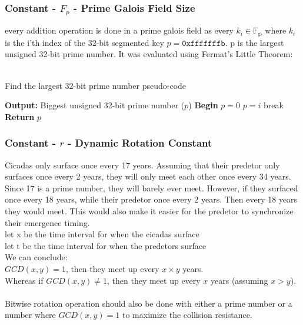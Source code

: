 \documentclass[fleqn, a4paper,12pt]{article}
\begin{document}
\subsubsection{Constant - $F_p$ - Prime Galois Field Size}

every addition operation is done in a prime galois field as every $k_i \in \mathbb{F_p}$ where $k_i$ is the i'th index of the 32-bit segmented key $p = \texttt{0xfffffffb}$. p is the largest unsigned 32-bit prime number. It was evaluated using Fermat's Little Theorem:\\
\\
\begin{algorithm}[H] %
\caption{Find the largest 32-bit prime number pseudo-code}
\begin{algorithmic}[1]  %
\State \textbf{Output:} Biggest unsigned 32-bit prime number ($p$)
\State \textbf{Begin}
\State $p = 0$
		\State $p = i$
		\State break
	\EndIf
\EndFor
\State \textbf{Return} $p$
\end{algorithmic}
\end{algorithm}

\subsubsection{Constant - $r$ - Dynamic Rotation Constant} \label{rotation_constant}

Cicadas only surface once every 17 years. Assuming that their predetor only surfaces once every 2 years, they will only meet each other once every 34 years. Since 17 is a prime number, they will barely ever meet. However, if they surfaced once every 18 years, while their predetor once every 2 years. Then every 18 years they would meet. This would also make it easier for the predetor to synchronize their emergence timing.\\
let x be the time interval for when the cicadas surface \\
let t be the time interval for when the predetors surface \\
We can conclude:\\
$GCD(x,y) = 1$, then they meet up every $x \times y$ years. \\
Whereas if $GCD(x,y) \neq 1$, then they meet up every $x$ years (assuming $x > y$). \\
\\
Bitwise rotation operation should also be done with either a prime number or a number where $GCD(x,y) = 1$ to maximize the collision resistance.\\
\end{document}
